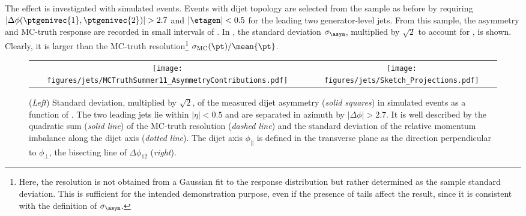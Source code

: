 The effect is investigated with simulated events.
Events with dijet topology are selected from the \pythia sample as before by requiring \mbox{$|\Delta\phi(\ptgenivec{1},\ptgenivec{2})| > 2.7$} and \mbox{$|\etagen| < 0.5$} for the leading two generator-level jets.
From this sample, the asymmetry and MC-truth response are recorded in small intervals of \ptgen.
In , the standard deviation $\sigma_{\asym}$, multiplied by $\sqrt{2}$ to account for , is shown.
Clearly, it is larger than the MC-truth resolution\footnote{Here, the resolution is not obtained from a Gaussian fit to the response distribution but rather determined as the sample standard deviation.
This is sufficient for the intended demonstration purpose, even if the presence of tails affect the result, since it is consistent with the definition of $\sigma_{\asym}$.} \mbox{$\sigma_{\text{MC}}(\pt)/\mean{\pt}$}.
\begin{figure}[!ht]
  \centering
  \begin{tabular}{cc}
    \texttt{[image: figures/jets/MCTruthSummer11\_AsymmetryContributions.pdf]} &
    \texttt{[image: figures/jets/Sketch\_Projections.pdf]} \\
  \end{tabular}
  \caption{(\textit{Left}) Standard deviation, multiplied by $\sqrt{2}$, of the measured dijet asymmetry (\textit{solid squares}) in simulated events as a function of \ptgen.
    The two leading jets lie within \mbox{$|\eta| < 0.5$} and are separated in azimuth by \mbox{$|\Delta\phi| > 2.7$}.
    It is well described by the quadratic sum (\textit{solid line}) of the MC-truth resolution (\textit{dashed line}) and the standard deviation of the relative momentum imbalance along the dijet axis (\textit{dotted line}).
    The dijet axis $\phi_{||}$ is defined in the transverse plane as the direction perpendicular to $\phi_{\perp}$, the bisecting line of $\Delta\phi_{12}$ (\textit{right}).
}
  \label{fig:Jets:Resolution:Asymmetry:Contributions}
\end{figure}

